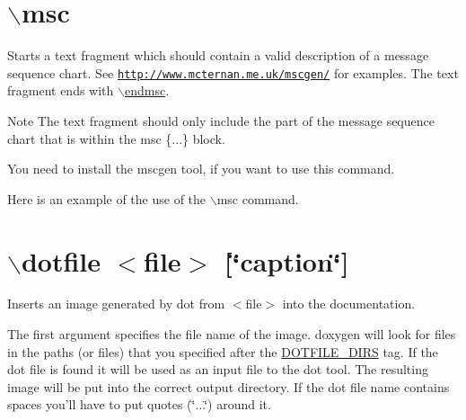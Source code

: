  \hypertarget{commands_cmdmsc}{}\section{$\backslash$msc}\label{commands_cmdmsc}
 Starts a text fragment which should contain a valid description of a message sequence chart. See \href{http://www.mcternan.me.uk/mscgen/}{\tt http://www.mcternan.me.uk/mscgen/} for examples. The text fragment ends with \hyperlink{commands_cmdendmsc}{$\backslash$endmsc}. \begin{DoxyNote}{Note}
The text fragment should only include the part of the message sequence chart that is within the {\ttfamily msc \{...\}} block. 

You need to install the {\ttfamily mscgen} tool, if you want to use this command.
\end{DoxyNote}
Here is an example of the use of the $\backslash$msc command. 




 \hypertarget{commands_cmddotfile}{}\section{$\backslash$dotfile $<$file$>$ \mbox{[}\char`\"{}caption\char`\"{}\mbox{]}}\label{commands_cmddotfile}
 Inserts an image generated by dot from $<$file$>$ into the documentation.

The first argument specifies the file name of the image. doxygen will look for files in the paths (or files) that you specified after the \hyperlink{config_cfg_dotfile_dirs}{DOTFILE\_\-DIRS} tag. If the dot file is found it will be used as an input file to the dot tool. The resulting image will be put into the correct output directory. If the dot file name contains spaces you'll have to put quotes (\char`\"{}...\char`\"{}) around it.


